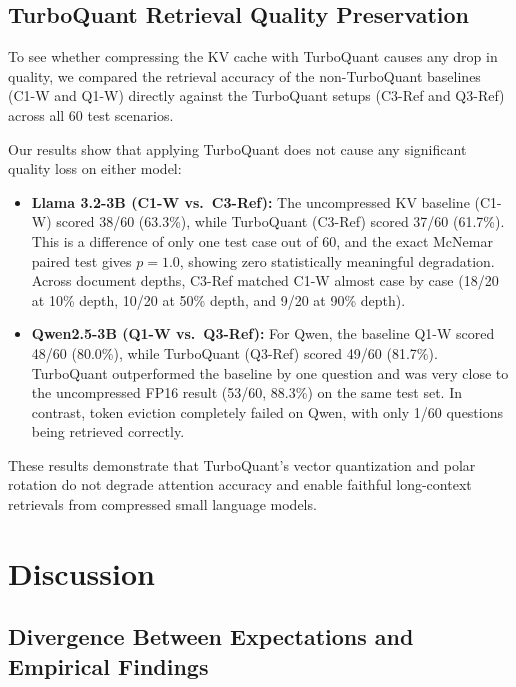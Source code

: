 \documentclass[sigconf,nonacm]{acmart}
\begin{document}
\subsection{TurboQuant Retrieval Quality Preservation}

To see whether compressing the KV cache with TurboQuant causes any drop in quality, we compared the retrieval accuracy of the non-TurboQuant baselines (C1-W and Q1-W) directly against the TurboQuant setups (C3-Ref and Q3-Ref) across all 60 test scenarios.

Our results show that applying TurboQuant does not cause any significant quality loss on either model:
\begin{itemize}
  \item \textbf{Llama 3.2-3B (C1-W vs.\ C3-Ref):} The uncompressed KV baseline (C1-W) scored 38/60 (63.3\%), while TurboQuant (C3-Ref) scored 37/60 (61.7\%). This is a difference of only one test case out of 60, and the exact McNemar paired test gives $p = 1.0$, showing zero statistically meaningful degradation. Across document depths, C3-Ref matched C1-W almost case by case (18/20 at 10\% depth, 10/20 at 50\% depth, and 9/20 at 90\% depth).
  \item \textbf{Qwen2.5-3B (Q1-W vs.\ Q3-Ref):} For Qwen, the baseline Q1-W scored 48/60 (80.0\%), while TurboQuant (Q3-Ref) scored 49/60 (81.7\%). TurboQuant outperformed the baseline by one question and was very close to the uncompressed FP16 result (53/60, 88.3\%) on the same test set. In contrast, token eviction completely failed on Qwen, with only 1/60 questions being retrieved correctly.


\end{itemize}

These results demonstrate that TurboQuant’s vector quantization and polar rotation do not degrade attention accuracy and enable faithful long-context retrievals from compressed small language models.


\section{Discussion}

\subsection{Divergence Between Expectations and Empirical Findings}
\end{document}
